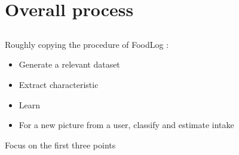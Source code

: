 \documentclass[aspectratio=169]{beamer}
\let\oldsection\section
\renewcommand{\section}[1]{
    \oldsection{#1}	
    \subsection{}
}
\newenvironment{myframe}[1][t]{\begin{frame}[#1]{\secname}{\subsecname}}{\end{frame}}
\begin{document}
     \section{Overall process}
     
     \begin{myframe}
         Roughly copying the procedure of FoodLog \cite{Kitamura2009, Kitamura2008, DeSilva2011, Aizawa2013, Kagaya2014}:
         \begin{itemize}
             \item Generate a relevant dataset
             \item Extract characteristic
             \item Learn
             \item For a new picture from a user, classify and estimate intake
         \end{itemize}
         Focus on the first three points
     \end{myframe}
    
\end{document}
